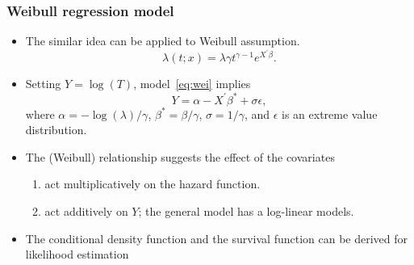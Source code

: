 \documentclass[10pt]{beamer}\usepackage[]{graphicx}\usepackage[]{color}
\begin{document}
\begin{frame}
  \frametitle{Weibull regression model}
  \begin{itemize}
  \item The similar idea can be applied to Weibull assumption. 
    \begin{equation}
      \lambda(t; x) = \lambda\gamma t^{\gamma-1}e^{X^\prime\beta}.
      \label{eq:wei}
    \end{equation}
  \item Setting $Y = \log(T)$, model~\ref{eq:wei} implies
    \begin{equation}
      Y = \alpha - X^\prime\beta^* + \sigma\epsilon,
      \label{eq:wei-aft}
    \end{equation}
    where $\alpha = -\log(\lambda) / \gamma$, $\beta^* = \beta/\gamma$, $\sigma = 1 / \gamma$,
    and $\epsilon$ is an extreme value distribution.
  \item The (Weibull) relationship suggests the effect of the covariates
    \begin{enumerate}
    \item act multiplicatively on the hazard function.
    \item act additively on $Y$; the general model has a log-linear models.
    \end{enumerate}
  \item The conditional density function and the survival function can be derived for
    likelihood estimation
  \end{itemize}
\end{frame}
\end{document}
